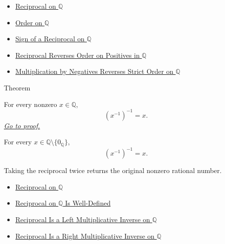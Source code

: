 \begin{dependencies}
\begin{itemize}
  \item \hyperref[def:reciprocal-on-q-classes]{Reciprocal on $\mathbb{Q}$}
  \item \hyperref[def:order-on-q]{Order on $\mathbb{Q}$}
  \item \hyperref[thm:sign-of-reciprocal-q]{Sign of a Reciprocal on $\mathbb{Q}$}
  \item \hyperref[thm:reciprocal-reverses-order-on-positives-q]{Reciprocal Reverses Order on Positives in $\mathbb{Q}$}
  \item \hyperref[thm:negative-multiplication-reverses-strict-order-on-q]{Multiplication by Negatives Reverses Strict Order on $\mathbb{Q}$}
\end{itemize}
\end{dependencies}

\begin{theorembox}{Theorem}
\begin{theorem}
\label{thm:reciprocal-involutive-on-q}
For every nonzero $x\in\mathbb{Q}$,
\[
(x^{-1})^{-1}=x.
\]
\hyperref[prf:reciprocal-involutive-on-q]{\textit{Go to proof.}}
\end{theorem}
\end{theorembox}

\begin{remark*}
For every $x\in\mathbb{Q}\setminus\{0_{\mathbb{Q}}\}$,
\[
(x^{-1})^{-1}=x.
\]
\end{remark*}

\begin{remark*}[Interpretation]
Taking the reciprocal twice returns the original nonzero rational number.
\end{remark*}

\begin{dependencies}
\begin{itemize}
  \item \hyperref[def:reciprocal-on-q-classes]{Reciprocal on $\mathbb{Q}$}
  \item \hyperref[thm:reciprocal-on-q-well-defined]{Reciprocal on $\mathbb{Q}$ Is Well-Defined}
  \item \hyperref[thm:reciprocal-left-multiplicative-inverse-on-q]{Reciprocal Is a Left Multiplicative Inverse on $\mathbb{Q}$}
  \item \hyperref[cor:reciprocal-right-multiplicative-inverse-on-q]{Reciprocal Is a Right Multiplicative Inverse on $\mathbb{Q}$}
\end{itemize}
\end{dependencies}

